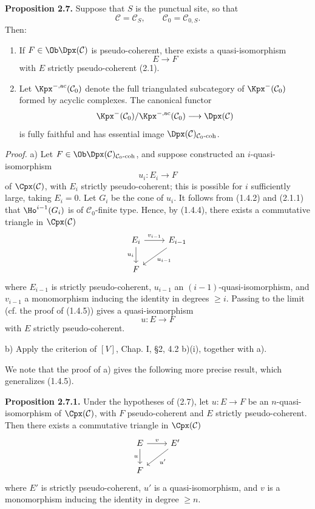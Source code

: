\documentclass[11pt]{article}
\begin{document}
\textbf{Proposition 2.7.} Suppose that \(S\) is the punctual site, so that
\[
  \mathcal C=\mathcal C_S,\qquad \mathcal C_0=\mathcal C_{0,S}.
\]
Then:
\begin{enumerate}[label=\alph*)]
\item If \(F\in\Ob\Dpx(\mathcal C)\) is pseudo-coherent, there exists a quasi-isomorphism
\[
  E\longrightarrow F
\]
with \(E\) strictly pseudo-coherent (2.1).
\item Let \(\Kpx^{-,\mathrm{ac}}(\mathcal C_0)\) denote the full triangulated subcategory of \(\Kpx^-(\mathcal C_0)\) formed by acyclic complexes. The canonical functor
\[
  \Kpx^-(\mathcal C_0)/\Kpx^{-,\mathrm{ac}}(\mathcal C_0)
  \longrightarrow \Dpx(\mathcal C)
\]
is fully faithful and has essential image \(\Dpx(\mathcal C)_{\mathcal C_0\text{-}\mathrm{coh}}\).
\end{enumerate}

\emph{Proof.} a) Let \(F\in\Ob\Dpx(\mathcal C)_{\mathcal C_0\text{-}\mathrm{coh}}\), and suppose constructed an \(i\)-quasi-isomorphism
\[
  u_i:E_i\longrightarrow F
\]
of \(\Cpx(\mathcal C)\), with \(E_i\) strictly pseudo-coherent; this is possible for \(i\) sufficiently large, taking \(E_i=0\). Let \(G_i\) be the cone of \(u_i\). It follows from (1.4.2) and (2.1.1) that \(\Ho^{i-1}(G_i)\) is of \(\mathcal C_0\)-finite type. Hence, by (1.4.4), there exists a commutative triangle in \(\Cpx(\mathcal C)\)
\[
\begin{tikzcd}
E_i \arrow[r,"v_{i-1}"] \arrow[d,"u_i"'] & E_{i-1} \arrow[dl,"u_{i-1}"]\\
F &
\end{tikzcd}
\]
where \(E_{i-1}\) is strictly pseudo-coherent, \(u_{i-1}\) an \((i-1)\)-quasi-isomorphism, and \(v_{i-1}\) a monomorphism inducing the identity in degrees \(\geq i\). Passing to the limit (cf. the proof of (1.4.5)) gives a quasi-isomorphism
\[
  u:E\longrightarrow F
\]
with \(E\) strictly pseudo-coherent.

b) Apply the criterion of \([V]\), Chap. I, §2, 4.2 b)(i), together with a).

We note that the proof of a) gives the following more precise result, which generalizes (1.4.5).

\textbf{Proposition 2.7.1.} Under the hypotheses of (2.7), let \(u:E\to F\) be an \(n\)-quasi-isomorphism of \(\Cpx(\mathcal C)\), with \(F\) pseudo-coherent and \(E\) strictly pseudo-coherent. Then there exists a commutative triangle in \(\Cpx(\mathcal C)\)
\[
\begin{tikzcd}
E \arrow[r,"v"] \arrow[d,"u"'] & E' \arrow[dl,"u'"]\\
F &
\end{tikzcd}
\]
where \(E'\) is strictly pseudo-coherent, \(u'\) is a quasi-isomorphism, and \(v\) is a monomorphism inducing the identity in degree \(\geq n\).
\end{document}
